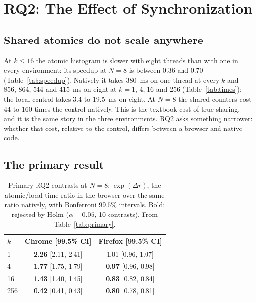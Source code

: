 \section{RQ2: The Effect of Synchronization}
\label{sec:rq2}

\subsection{Shared atomics do not scale anywhere}

At $k \leq 16$ the atomic histogram is slower with eight threads than with
one in every environment: its speedup at $N=8$ is between 0.36 and 0.70
(Table~\ref{tab:speedup}). Natively it takes 380~ms on one thread at every
$k$ and 856, 864, 544 and 415~ms on eight at $k=1$, 4, 16 and 256
(Table~\ref{tab:times}); the local control takes 3.4 to 19.5~ms on eight.
At $N=8$ the shared counters cost 44 to 160 times the control natively.
This is the textbook cost of true sharing, and it is the same story in the
three environments. RQ2 asks something narrower: whether that cost,
relative to the control, differs between a browser and native code.

\subsection{The primary result}

\begin{table}[htbp]
\caption{Primary RQ2 contrasts at $N=8$: $\exp(\Delta r)$, the atomic/local
time ratio in the browser over the same ratio natively, with Bonferroni
99.5\% intervals. Bold: rejected by Holm ($\alpha=0.05$, 10 contrasts).
From Table~\ref{tab:primary}.}
\label{tab:rq2}
\centering\small
\begin{tabular}{lcc}
\toprule
$k$ & Chrome [99.5\% CI] & Firefox [99.5\% CI] \\
\midrule
1 & \textbf{2.26} [2.11, 2.41] & 1.01 [0.96, 1.07] \\
4 & \textbf{1.77} [1.75, 1.79] & \textbf{0.97} [0.96, 0.98] \\
16 & \textbf{1.43} [1.40, 1.45] & \textbf{0.83} [0.82, 0.84] \\
256 & \textbf{0.42} [0.41, 0.43] & \textbf{0.80} [0.78, 0.81] \\
\bottomrule
\end{tabular}
\end{table}


